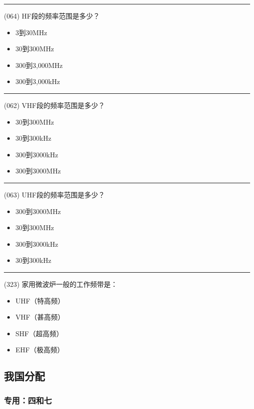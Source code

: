 \documentclass[twocolumn,hyperref,UTF8]{ctexart}  %
\begin{document}
\noindent\rule{0.5\textwidth}{1pt}
\heiti (064) HF段的频率范围是多少？ \songti {\color{gray} [LK1114] }
\begin{itemize}
	\item  3到30MHz
	\item  30到300MHz
	\item  300到3,000MHz
	\item  300到3,000kHz
\end{itemize}


\noindent\rule{0.5\textwidth}{1pt}
\heiti (062) VHF段的频率范围是多少？ \songti {\color{gray} [LK1112] }
\begin{itemize}
	\item  30到300MHz
	\item  30到300kHz
	\item  300到3000kHz
	\item  300到3000MHz
\end{itemize}


\noindent\rule{0.5\textwidth}{1pt}
\heiti (063) UHF段的频率范围是多少？ \songti {\color{gray} [LK1113] }
\begin{itemize}
	\item  300到3000MHz
	\item  30到300MHz
	\item  300到3000kHz
	\item  30到300kHz
\end{itemize}


\noindent\rule{0.5\textwidth}{1pt}
\heiti (323) 家用微波炉一般的工作频带是： \songti {\color{gray} [LK1064] }
\begin{itemize}
	\item  UHF（特高频）
	\item  VHF（甚高频）
	\item  SHF（超高频）
	\item  EHF（极高频）
\end{itemize}


\clearpage
\subsection{我国分配}


\vspace{12pt}
\subsubsection{专用：四和七}
\end{document}

